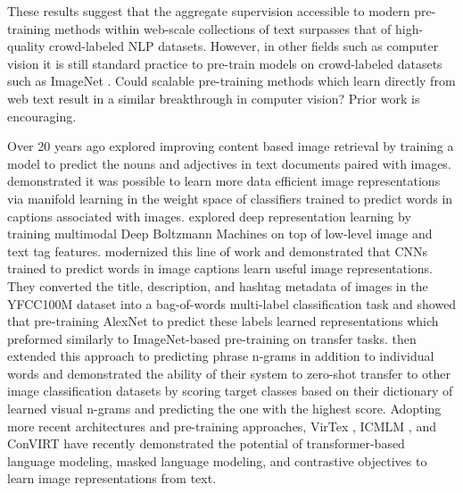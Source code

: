 These results suggest that the aggregate supervision accessible to modern pre-training methods within web-scale collections of text surpasses that of high-quality crowd-labeled NLP datasets. However, in other fields such as computer vision it is still standard practice to pre-train models on crowd-labeled datasets such as ImageNet \citep{imagenet_cvpr09}. Could scalable pre-training methods which learn directly from web text result in a similar breakthrough in computer vision? Prior work is encouraging.

Over 20 years ago \citet{mori1999image} explored improving content based image retrieval by training a model to predict the nouns and adjectives in text documents paired with images. \citet{quattoni2007learning} demonstrated it was possible to learn more data efficient image representations via manifold learning in the weight space of classifiers trained to predict words in captions associated with images. \citet{srivastava2012multimodal} explored deep representation learning by training multimodal Deep Boltzmann Machines on top of low-level image and text tag features. \citet{joulin2016learning} modernized this line of work and demonstrated that CNNs trained to predict words in image captions learn useful image representations. They converted the title, description, and hashtag metadata of images in the YFCC100M dataset \citep{thomee2016yfcc100m} into a bag-of-words multi-label classification task and showed that pre-training AlexNet \citep{krizhevsky2012imagenet} to predict these labels learned representations which preformed similarly to ImageNet-based pre-training on transfer tasks. \citet{li2017learning} then extended this approach to predicting phrase n-grams in addition to individual words and demonstrated the ability of their system to zero-shot transfer to other image classification datasets by scoring target classes based on their dictionary of learned visual n-grams and predicting the one with the highest score. Adopting more recent architectures and pre-training approaches, VirTex \citep{desai2020virtex}, ICMLM \citep{bulent2020learning}, and ConVIRT \citep{zhang2020contrastive} have recently demonstrated the potential of transformer-based language modeling, masked language modeling, and contrastive objectives to learn image representations from text.

